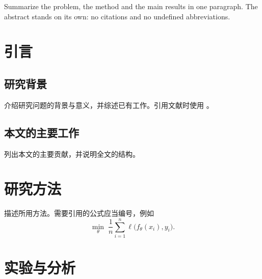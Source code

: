 \documentclass[degree=master,fontset=fandol]{thuthesis}
\begin{document}
\maketitle
\copyrightpage

\frontmatter

\begin{abstract}
  用一段话概述研究的问题、方法与主要结论。摘要应当独立成篇，
不使用引用和未定义的缩写。

\end{abstract}

\begin{abstract*}
  Summarize the problem, the method and the main results in one
paragraph. The abstract stands on its own: no citations and no undefined
abbreviations.

\end{abstract*}

\tableofcontents
\listoftables

\mainmatter

\chapter{引言}
\label{chap:intro}

\section{研究背景}
介绍研究问题的背景与意义，并综述已有工作。引用文献时使用
\cite{knuth1984texbook,lamport1994latex}。

\section{本文的主要工作}
列出本文的主要贡献，并说明全文的结构。

\chapter{研究方法}
\label{chap:method}

描述所用方法。需要引用的公式应当编号，例如
\begin{equation}
  \label{eq:objective}
  \min_{\theta} \; \frac{1}{n} \sum_{i=1}^{n} \ell\bigl(f_\theta(x_i), y_i\bigr) .
\end{equation}

\chapter{实验与分析}
\label{chap:experiments}
\end{document}
